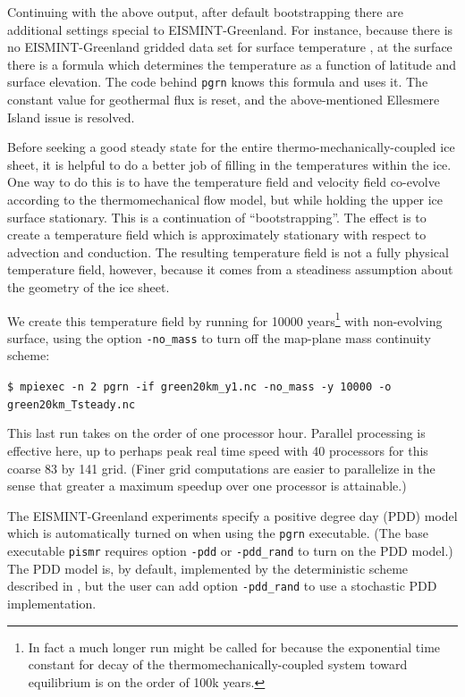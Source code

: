 \documentclass[11pt,final]{amsart}
\begin{document}
Continuing with the above output, after default bootstrapping there are additional settings special to EISMINT-Greenland.  For instance, because there is no EISMINT-Greenland gridded data set for surface temperature \cite{RitzEISMINT}, at the surface there is a formula which determines the temperature as a function of latitude and surface elevation.  The code behind \verb|pgrn| knows this formula and uses it.  The constant value for geothermal flux is reset, and the above-mentioned Ellesmere Island issue is resolved.

Before seeking a good steady state for the entire thermo-mechanically-coupled ice sheet, it is helpful to do a better job of filling in the temperatures within the ice.  One way to do this is to have the temperature field and velocity field co-evolve according to the thermomechanical flow model, but while holding the upper ice surface stationary.  This is a continuation of ``bootstrapping''.  The effect is to create a temperature field which is approximately stationary with respect to advection and conduction.  The resulting temperature field is not a fully physical temperature field, however, because it comes from a steadiness assumption about the geometry of the ice sheet.

We create this temperature field by running for 10000 years\footnote{In fact a much longer run might be called for because the exponential time constant for decay of the thermomechanically-coupled system toward equilibrium is on the order of 100k years.} with non-evolving surface, using the option \verb|-no_mass| to turn off the map-plane mass continuity scheme:

\verb|$ mpiexec -n 2 pgrn -if green20km_y1.nc -no_mass -y 10000 -o green20km_Tsteady.nc|

This last run takes on the order of one processor hour.  Parallel processing is effective here, up to perhaps peak real time speed with 40 processors for this coarse 83 by 141 grid.  (Finer grid computations are easier to parallelize in the sense that greater a maximum speedup over one processor is attainable.)

The EISMINT-Greenland experiments \cite{RitzEISMINT} specify a positive degree day (PDD) model which is automatically turned on when using the \verb|pgrn| executable.  (The base executable \verb|pismr| requires option \verb|-pdd| or \verb|-pdd_rand| to turn on the PDD model.)  The PDD model is, by default, implemented by the deterministic scheme described in \cite{CalovGreve05}, but the user can add option \verb|-pdd_rand| to use a stochastic PDD implementation.
\end{document}
